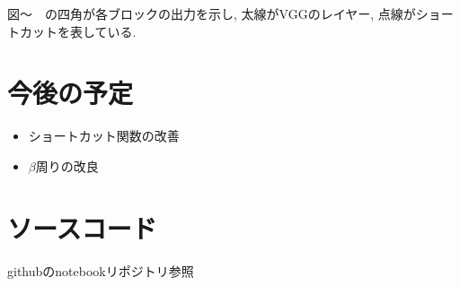 \documentclass[twocolumn]{jarticle}     %
\begin{document}
図～　の四角が各ブロックの出力を示し, 太線がVGGのレイヤー, 点線がショートカットを表している.

\section{今後の予定}

\begin{itemize}
  \item ショートカット関数の改善
  \item $\beta$周りの改良
\end{itemize}

\section{ソースコード}
githubのnotebookリポジトリ参照



\end{document}
